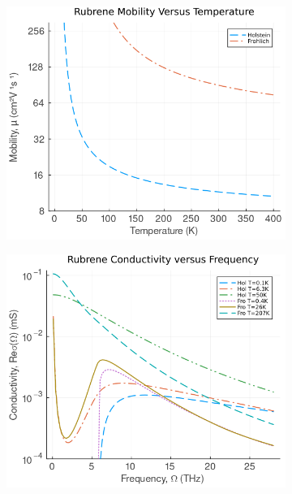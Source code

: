 \begin{figure}[!tbp]
\begin{subfigure}[b]{0.49\textwidth}
    \label{fig:rubene_vw_temp}
  \end{subfigure}
  \begin{subfigure}[b]{0.49\textwidth}
    \centering
    \includegraphics[width=\textwidth]{figures/rubrene_mobility_temp_plot.png}
    \label{fig:rubrene_mobility_temp}
  \end{subfigure}
  \hfill
  \begin{subfigure}[b]{0.49\textwidth}
    \centering
    \includegraphics[width=\textwidth]{figures/rubrene_cond_freq.png}
    \label{fig:rubrene_cond_freq}

\end{subfigure}
\end{figure}
